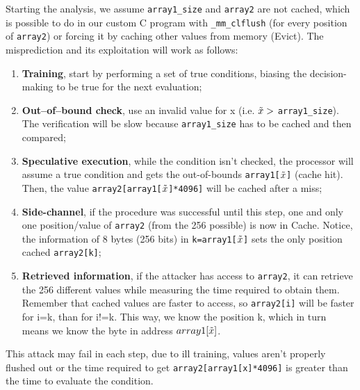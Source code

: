 \documentclass[conference]{IEEEtran}
\begin{document}
Starting the analysis, we assume \texttt{array1\_size} and \texttt{array2} are not cached, which is possible to do in our custom C program with \texttt{\_mm\_clflush} (for every position of \texttt{array2}) or forcing it by caching other values from memory (Evict). The misprediction and its exploitation will work as follows:
\begin{enumerate}
    \item \textbf{Training}, start by performing a set of true conditions, biasing the decision-making to be true for the next evaluation;
    \item \textbf{Out--of--bound check}, use an invalid value for x (i.e. $\Tilde{x} >$ \texttt{array1\_size}). The verification will be slow because \texttt{array1\_size} has to be cached and then compared;
    \item \textbf{Speculative execution}, while the condition isn't checked, the processor will assume a true condition and gets the out-of-bounds \texttt{array1[$\Tilde{x}$]} (cache hit). Then, the value \texttt{array2[array1[$\Tilde{x}$]*4096]} will be cached after a miss;
    \item \textbf{Side-channel}, if the procedure was successful until this step, one and only one position/value of \texttt{array2} (from the 256 possible) is now in Cache. Notice, the information of 8 bytes (256 bits) in \texttt{k=array1[$\Tilde{x}$]} sets the only position cached \texttt{array2[k]};
    \item \textbf{Retrieved information}, if the attacker has access to \texttt{array2}, it can retrieve the 256 different values while measuring the time required to obtain them. Remember that cached values are faster to access, so \texttt{array2[i]} will be faster for i=k, than for i!=k. This way, we know the position k, which in turn means we know the byte in address \texttt{$array1[\Tilde{x}]$}.
\end{enumerate}

This attack may fail in each step, due to ill training, values aren't properly flushed out or the time required to get \texttt{array2[array1[x]*4096]} is greater than the time to evaluate the condition.
\end{document}
